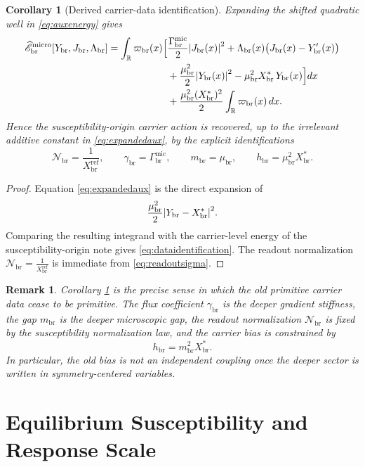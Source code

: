 \documentclass[11pt]{article}
\newcommand{\ProfWeight}{\varpi_{\mathrm{br}}}
\newcommand{\RespCarrier}{Y_{\mathrm{br}}}
\newcommand{\RespFlux}{J_{\mathrm{br}}}
\newcommand{\RespCompat}{\Lambda_{\mathrm{br}}}
\newcommand{\RespNorm}{\mathcal N_{\mathrm{br}}}
\newcommand{\RespFluxCoeff}{\gamma_{\mathrm{br}}}
\newcommand{\RespGap}{m_{\mathrm{br}}}
\newcommand{\RespBias}{h_{\mathrm{br}}}
\newcommand{\RespMicroEq}{X_{\mathrm{br}}^{\ast}}
\newcommand{\RespMicroRef}{X_{\mathrm{br}}^{\mathrm{ref}}}
\newcommand{\RespMicroFluxCoeff}{\Gamma_{\mathrm{br}}^{\mathrm{mic}}}
\newcommand{\RespMicroGap}{\mu_{\mathrm{br}}}
\newcommand{\RespMicroAuxEnergy}{\widehat{\mathscr E}_{\mathrm{br}}^{\mathrm{micro}}}
\newtheorem{remark}{Remark}
\newtheorem{corollary}{Corollary}
\begin{document}
\begin{corollary}[Derived carrier-data identification]
\label{cor:carrierdata}
Expanding the shifted quadratic well in \eqref{eq:auxenergy} gives
\begin{align}
\RespMicroAuxEnergy[\RespCarrier,\RespFlux,\RespCompat]
=
\int_{\mathbb R}\ProfWeight(x)\Bigl[
&\frac{\RespMicroFluxCoeff}{2}\abs{\RespFlux(x)}^2
+\RespCompat(x)\bigl(\RespFlux(x)-\RespCarrier'(x)\bigr)
\nonumber\\
&+\frac{\RespMicroGap^2}{2}\abs{\RespCarrier(x)}^2
-\RespMicroGap^2\RespMicroEq\,\RespCarrier(x)
\Bigr]dx
\nonumber\\
&+\frac{\RespMicroGap^2(\RespMicroEq)^2}{2}\int_{\mathbb R}\ProfWeight(x)\,dx.
\label{eq:expandedaux}
\end{align}
Hence the susceptibility-origin carrier action is recovered, up to the irrelevant additive constant in \eqref{eq:expandedaux}, by the explicit identifications
\begin{equation}
\RespNorm=\frac{1}{\RespMicroRef},
\qquad
\RespFluxCoeff=\RespMicroFluxCoeff,
\qquad
\RespGap=\RespMicroGap,
\qquad
\RespBias=\RespMicroGap^2\RespMicroEq.
\label{eq:dataidentification}
\end{equation}
\end{corollary}

\begin{proof}
Equation \eqref{eq:expandedaux} is the direct expansion of
\[
\frac{\RespMicroGap^2}{2}\abs{\RespCarrier-\RespMicroEq}^2.
\]
Comparing the resulting integrand with the carrier-level energy of the susceptibility-origin note gives \eqref{eq:dataidentification}. The readout normalization \(\RespNorm=\frac{1}{\RespMicroRef}\) is immediate from \eqref{eq:readoutsigma}.
\end{proof}

\begin{remark}
Corollary \ref{cor:carrierdata} is the precise sense in which the old primitive carrier data cease to be primitive. The flux coefficient \(\RespFluxCoeff\) is the deeper gradient stiffness, the gap \(\RespGap\) is the deeper microscopic gap, the readout normalization \(\RespNorm\) is fixed by the susceptibility normalization law, and the carrier bias is constrained by
\[
\RespBias=\RespGap^2\RespMicroEq.
\]
In particular, the old bias is not an independent coupling once the deeper sector is written in symmetry-centered variables.
\end{remark}

\section{Equilibrium Susceptibility and Response Scale}
\end{document}

